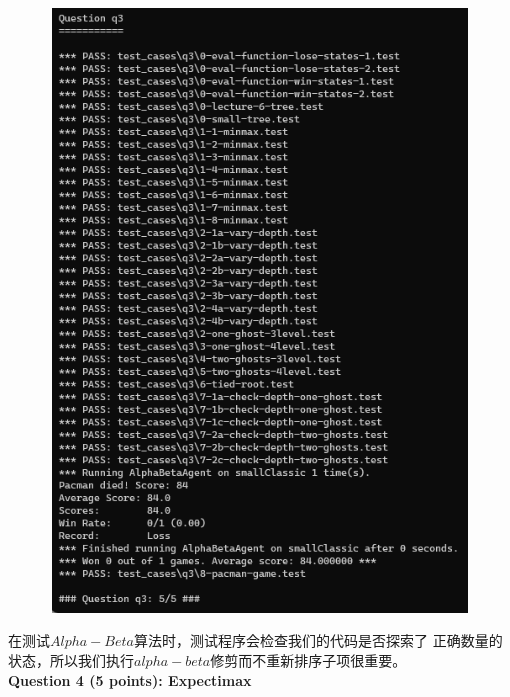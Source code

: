 \documentclass[a4paper,12pt,UTF8]{article}
\begin{document}
\begin{flushleft}
{{{        }
    }
    \begin{figure}[h]
        \centering
        \includegraphics[width=12cm,height=16cm]{3.png}
    \end{figure}
    \normalsize{
        \hspace{1cm}在测试$Alpha-Beta$算法时，测试程序会检查我们的代码是否探索了
        正确数量的状态，所以我们执行$alpha-beta$修剪而不重新排序子项很重要。\\
    }
    \newpage
    \large{
        \hspace{1cm}\textbf{
            Question 4 (5 points): Expectimax\\
        }
    }
    \begin{figure}[h]
        \centering

\end{figure}}
\end{flushleft}
\end{document}
